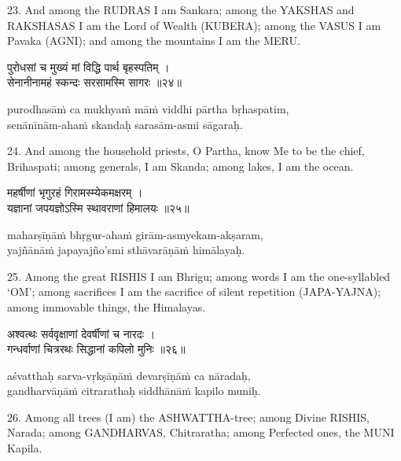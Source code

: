 23. And among the RUDRAS I am Sankara; among the YAKSHAS and RAKSHASAS I am the
Lord of Wealth (KUBERA); among the VASUS I am Pavaka (AGNI); and among the
mountains I am the MERU.\@

\begin{gitaverse}
पुरोधसां च मुख्यं मां विद्धि पार्थ बृहस्पतिम् । \\
सेनानीनामहं स्कन्दः सरसामस्मि सागरः ॥२४॥
\end{gitaverse}

\begin{transliteration}
purodhasāṁ ca mukhyaṁ māṁ viddhi pārtha bṛhaspatim, \\
senānīnām-ahaṁ skandaḥ sarasām-asmi sāgaraḥ.
\end{transliteration}

24. And among the household priests, O Partha, know Me to be the chief,
Brihaspati; among generals, I am Skanda; among lakes, I am the ocean.

\begin{gitaverse}
महर्षीणां भृगुरहं गिरामस्म्येकमक्षरम् । \\
यज्ञानां जपयज्ञोऽस्मि स्थावराणां हिमालयः ॥२५॥
\end{gitaverse}

\begin{transliteration}
maharṣīṇāṁ bhṛgur-ahaṁ girām-asmyekam-akṣaram, \\
yajñānāṁ japayajño'smi sthāvarāṇāṁ himālayaḥ.
\end{transliteration}

25. Among the great RISHIS I am Bhrigu; among words I am the one-syllabled
`OM'; among sacrifices I am the sacrifice of silent repetition (JAPA-YAJNA);
among immovable things, the Himalayas.

\begin{gitaverse}
अश्वत्थः सर्ववृक्षाणां देवर्षीणां च नारदः । \\
गन्धर्वाणां चित्ररथः सिद्धानां कपिलो मुनिः ॥२६॥
\end{gitaverse}

\begin{transliteration}
aśvatthaḥ sarva-vṛkṣāṇāṁ devarṣīṇāṁ ca nāradaḥ, \\
gandharvāṇāṁ citrarathaḥ siddhānāṁ kapilo muniḥ.
\end{transliteration}

26. Among all trees (I am) the ASHWATTHA-tree; among Divine RISHIS, Narada;
among GANDHARVAS, Chitraratha; among Perfected ones, the MUNI Kapila.

